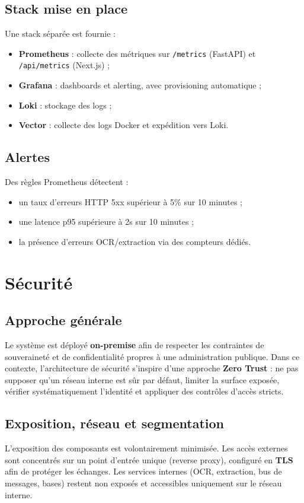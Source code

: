 \documentclass[12pt,a4paper]{report}
\begin{document}
\section{Stack mise en place}
Une stack séparée est fournie :
\begin{itemize}
  \item \textbf{Prometheus} : collecte des métriques sur \texttt{/metrics} (FastAPI) et \texttt{/api/metrics} (Next.js) ;
  \item \textbf{Grafana} : dashboards et alerting, avec provisioning automatique ;
  \item \textbf{Loki} : stockage des logs ;
  \item \textbf{Vector} : collecte des logs Docker et expédition vers Loki.
\end{itemize}

\section{Alertes}
Des règles Prometheus détectent :
\begin{itemize}
  \item un taux d’erreurs HTTP 5xx supérieur à 5\% sur 10 minutes ;
  \item une latence p95 supérieure à 2s sur 10 minutes ;
  \item la présence d’erreurs OCR/extraction via des compteurs dédiés.
\end{itemize}

\chapter{Sécurité}
\section{Approche générale}
Le système est déployé \textbf{on-premise} afin de respecter les contraintes de souveraineté et de confidentialité propres à une administration publique. Dans ce contexte, l’architecture de sécurité s’inspire d’une approche \textbf{Zero Trust} : ne pas supposer qu’un réseau interne est sûr par défaut, limiter la surface exposée, vérifier systématiquement l’identité et appliquer des contrôles d’accès stricts.

\section{Exposition, réseau et segmentation}
L’exposition des composants est volontairement minimisée. Les accès externes sont concentrés sur un point d’entrée unique (reverse proxy), configuré en \textbf{TLS} afin de protéger les échanges. Les services internes (OCR, extraction, bus de messages, bases) restent non exposés et accessibles uniquement sur le réseau interne.
\end{document}
